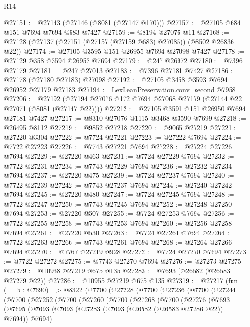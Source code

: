 \begin{lexlean}{R14}
\begin{coremodule}
@27151 := @27143 (@27146 (@8081 (@27147 @170)))
@27157 := @27105 @684 @151 @7694 @7694 @683 @7427
@27159 := @8194 @27076 @11
@27168 := @27128 (@27137 (@27151 (@27157 (@27159 @683) @27085)) (@8502 @26836 @22))
@27174 := @27105 @3595 @151 @26955 @7694 @27098 @7427
@27178 := @27129 @358 @3594 @26953 @7694
@27179 := @247 @26972
@27180 := @7396 @27179
@27181 := @247 @27013
@27183 := @7396 @27181 @7427
@27186 := @27178 (@27180 @27183) @27098
@27192 := @27105 @3458 @3593 @7694 @26952 @27179 @27183
@27194 := LexLeanPreservation.conv_second @7958
@27206 := @27192 (@27194 @27076 @172 @7694 @27068 @27179 (@27144 @22 @27071 (@8081 (@27147 @22))))
@27212 := @27105 @3591 @151 @26950 @7694 @27181 @7427
@27217 := @8310 @27076 @1115 @3468 @3590 @7699
@27218 := @26495 @8112
@27219 := @9852 @27218
@27220 := @9065 @27219
@27221 := @27220 @3304
@27222 := @7724 @27221
@27223 := @27222 @7694
@27224 := @7722 @27223
@27226 := @7743 @27221 @7694
@27228 := @27224 @27226 @7694
@27229 := @27220 @463
@27231 := @7724 @27229 @7694
@27232 := @7722 @27231
@27234 := @7743 @27229 @7694
@27236 := @27232 @27234 @7694
@27237 := @27220 @475
@27239 := @7724 @27237 @7694
@27240 := @7722 @27239
@27242 := @7743 @27237 @7694
@27244 := @27240 @27242 @7694
@27245 := @27220 @480
@27247 := @7724 @27245 @7694
@27248 := @7722 @27247
@27250 := @7743 @27245 @7694
@27252 := @27248 @27250 @7694
@27253 := @27220 @507
@27255 := @7724 @27253 @7694
@27256 := @7722 @27255
@27258 := @7743 @27253 @7694
@27260 := @27256 @27258 @7694
@27261 := @27220 @530
@27263 := @7724 @27261 @7694
@27264 := @7722 @27263
@27266 := @7743 @27261 @7694
@27268 := @27264 @27266 @7694
@27270 := @7767 @27219 @928
@27272 := @7724 @27270 @7694
@27273 := @7722 @27272
@27275 := @7743 @27270 @7694
@27276 := @27273 @27275
@27279 := @10938 @27219 @675 @135
@27283 := @7693 (@26582 (@26583 @27279 @22))
@27286 := @10955 @27219 @675 @135
@27319 := @27217
    (fun (__b : @7690) =>
    @8322
      (@7700
        (@27228
          (@7700
            (@27236
              (@7700
                (@27244
                  (@7700
                    (@27252
                      (@7700
                        (@27260
                          (@7700
                            (@27268
                              (@7700
                                (@27276
                                  (@7693
                                    (@7695
                                      (@7693
                                        (@7693
                                          (@27283 (@7693 (@26582 (@26583 @27286 @22)) @7694))
                                          @7694)

\end{coremodule}
\end{lexlean}
